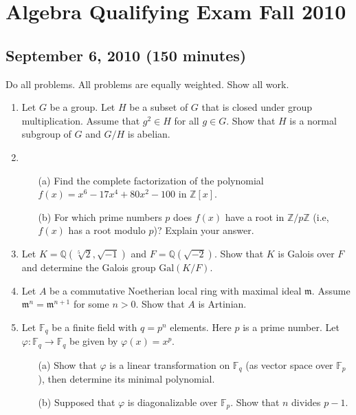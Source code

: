 \documentclass{article}
\begin{document}
\section*{Algebra Qualifying Exam Fall 2010}
\subsection*{September 6, 2010 (150 minutes)}

Do all problems. All problems are equally weighted. Show all work.

\begin{enumerate}
    \item Let \(G\) be a group. Let \(H\) be a subset of \(G\) that is closed under group multiplication. Assume that \(g^2 \in H\) for all \(g \in G\). Show that \(H\) is a normal subgroup of \(G\) and \(G/H\) is abelian.

    \item 
    \begin{itemize}
        \item[(a)] Find the complete factorization of the polynomial \(f(x) = x^6 - 17x^4 + 80x^2 - 100\) in \(\mathbb{Z}[x]\).
        \item[(b)] For which prime numbers \(p\) does \(f(x)\) have a root in \(\mathbb{Z}/p\mathbb{Z}\) (i.e, \(f(x)\) has a root modulo \(p\))? Explain your answer.
    \end{itemize}

    \item Let \(K = \mathbb{Q}(\sqrt[5]{2}, \sqrt{-1})\) and \(F = \mathbb{Q}(\sqrt{-2})\). Show that \(K\) is Galois over \(F\) and determine the Galois group \(\text{Gal}(K/F)\).

    \item Let \(A\) be a commutative Noetherian local ring with maximal ideal \(\mathfrak{m}\). Assume \(\mathfrak{m}^n = \mathfrak{m}^{n+1}\) for some \(n > 0\). Show that \(A\) is Artinian.

    \item Let \(\mathbb{F}_q\) be a finite field with \(q = p^n\) elements. Here \(p\) is a prime number. Let \(\varphi : \mathbb{F}_q \rightarrow \mathbb{F}_q\) be given by \(\varphi(x) = x^p\).
    \begin{itemize}
        \item[(a)] Show that \(\varphi\) is a linear transformation on \(\mathbb{F}_q\) (as vector space over \(\mathbb{F}_p\)), then determine its minimal polynomial.
        \item[(b)] Supposed that \(\varphi\) is diagonalizable over \(\mathbb{F}_p\). Show that \(n\) divides \(p - 1\).
    \end{itemize}


\end{enumerate}
\end{document}

